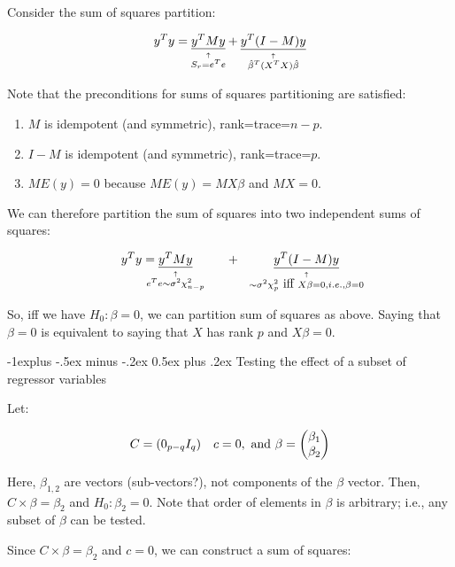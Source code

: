 \documentclass[10pt,landscape]{article}
\makeatletter
\newcommand{\explain}[2]{\underset{\mathclap{\overset{\uparrow}{#2}}}{#1}}
\renewcommand{\subsection}{\@startsection{subsection}{2}{0mm}%
                                {-1explus -.5ex minus -.2ex}%
                                {0.5ex plus .2ex}%
                                {\normalfont\normalsize\bfseries}}
\makeatother
\begin{document}
\begin{multicols}{3}
Consider the sum of squares partition:

\begin{equation}
y^T y = \explain{\underline{y^T M y}}{S_r= e^T e} + \explain{\underline{y^T (I-M) y}}{\hat{\beta}^T (X^T X)\hat{\beta}}
\end{equation}

Note that the preconditions for sums of squares partitioning are satisfied:
\begin{enumerate}
\item $M$ is idempotent  (and symmetric), rank=trace=$n-p$.
\item $I-M$ is idempotent (and symmetric), rank=trace=$p$.
\item $ME(y) = 0$ because $ME(y)=MX\beta$ and $MX=0$.
\end{enumerate}

We can therefore partition the sum of squares into two independent sums of squares:

\begin{equation}
y^T y = \explain{\underline{y^T M y}}{e^T e \sim \sigma^2 \chi_{n-p}^2} \hbox{~~~~~~~~}+\hbox{~~~~~~~~} 
\explain{\underline{y^T (I-M) y}}{ \sim \sigma^2 \chi_p^2 \newline \hbox{ iff } X\beta=0, i.e., \beta=0}
\end{equation}

So, iff we have $H_0: \beta=0$, we can partition sum of squares as above. Saying that $\beta=0$ is equivalent to saying that $X$ has rank $p$ and $X\beta=0$.

\subsection{Testing the effect of a subset of regressor variables}

Let:

\begin{equation}
C= (0_{p-q} I_q) \quad c=0, \hbox{ and } \beta=\begin{pmatrix} \beta_1\\ \beta_2 \end{pmatrix}
\end{equation}


Here, $\beta_{1,2}$ are vectors (sub-vectors?), not components of the $\beta$ vector.
Then, $C\times \beta = \beta_2$ and $H_0: \beta_2=0$. Note that order of elements in $\beta$ is arbitrary; i.e., any subset of $\beta$ can be tested.

Since  $C\times \beta = \beta_2$ and $c=0$, we can construct a sum of squares:


\end{multicols}
\end{document}
